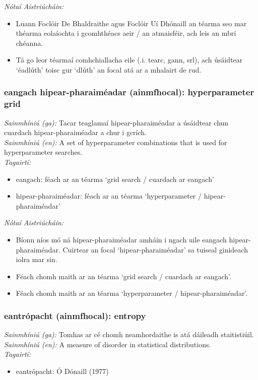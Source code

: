  \noindent \textit{Nótaí Aistriúcháin:}
\begin{itemize}
	\item Luann Foclóir De Bhaldraithe agus Foclóir Uí Dhónaill an téarma seo mar théarma eolaíochta i gcomhthéacs aeir / an atmaisféir, ach leis an mbrí chéanna.
	\item Tá go leor téarmaí comhchiallacha eile (.i. tearc, gann, srl), ach úsáidtear `éadlúth' toisc gur `dlúth' an focal atá ar a mhalairt de rud.
\end{itemize}


\subsubsection*{eangach hipear-pharaiméadar (ainmfhocal): hyperparameter grid}
 \noindent \textit{Sainmhíniú (ga):} Tacar teaglamaí hipear-pharaiméadar a úsáidtear chun cuardach hipear-pharaiméadar a chur i gcrích.
\\
 \noindent \textit{Sainmhíniú (en):} A set of hyperparameter combinations that is used for hyperparameter searches.
\\
 \noindent \textit{Tagairtí:}
\begin{itemize}
	\item eangach: féach ar an téarma `grid search / cuardach ar eangach'
	\item hipear-pharaiméadar: féach ar an téarma `hyperparameter / hipear-pharaiméadar'
\end{itemize}

 \noindent \textit{Nótaí Aistriúcháin:}
\begin{itemize}
	\item Bíonn níos mó ná hipear-pharaiméadar amháin i ngach uile eangach hipear-pharaiméadar. Cuirtear an focal `hipear-pharaiméadar' sa tuiseal ginideach iolra mar sin.
	\item Féach chomh maith ar an téarma `grid search / cuardach ar eangach'.
	\item Féach chomh maith ar an téarma `hyperparameter / hipear-pharaiméadar'.
\end{itemize}


\subsubsection*{eantrópacht (ainmfhocal): entropy}
 \noindent \textit{Sainmhíniú (ga):} Tomhas ar cé chomh neamhordaithe is atá dáileadh staitistiúil.
\\
 \noindent \textit{Sainmhíniú (en):} A measure of disorder in statistical distributions.
\\
 \noindent \textit{Tagairtí:}
\begin{itemize}
	\item eantrópacht: Ó Dónaill (1977) \cite{odonaill}
\end{itemize}


